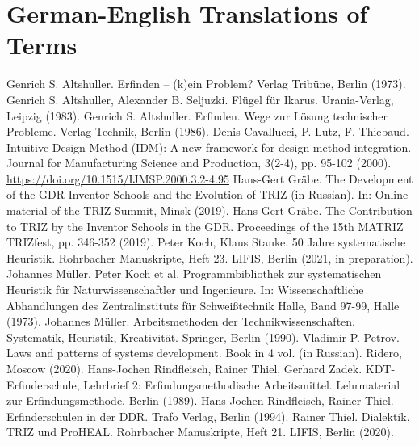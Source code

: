 \documentclass[11pt,a4paper]{article}
\begin{document}
\section{German-English Translations of Terms}



\begin{thebibliography}{xxx}
 Genrich S. Altshuller. Erfinden – (k)ein Problem?
  Verlag Tribüne, Berlin (1973).
  Genrich S. Altshuller, Alexander B. Seljuzki. Flügel
  für Ikarus. Urania-Verlag, Leipzig (1983).
 Genrich S. Altshuller. Erfinden. Wege zur Lösung
  technischer Probleme. Verlag Technik, Berlin (1986). 
 Denis Cavallucci, P. Lutz, F. Thiebaud. Intuitive
  Design Method (IDM): A new framework for design method integration. Journal
  for Manufacturing Science and Production, 3(2-4), pp. 95-102 (2000).
  \url{https://doi.org/10.1515/IJMSP.2000.3.2-4.95}
 Hans-Gert Gräbe. The Development of the GDR Inventor
  Schools and the Evolution of TRIZ (in Russian). In: Online material of the
  TRIZ Summit, Minsk (2019).
 Hans-Gert Gräbe. The Contribution to TRIZ by the
  Inventor Schools in the GDR. Proceedings of the 15th MATRIZ TRIZfest, pp.
  346-352 (2019).
 Peter Koch, Klaus Stanke. 50 Jahre systematische Heuristik.
  Rohrbacher Manuskripte, Heft 23. LIFIS, Berlin (2021, in preparation).
 Johannes Müller, Peter Koch et al. Programmbibliothek
  zur systematischen Heuristik für Naturwissenschaftler und Ingenieure. In:
  Wissenschaftliche Abhandlungen des Zentralinstituts für Schweißtechnik
  Halle, Band 97-99, Halle (1973).
 Johannes Müller. Arbeitsmethoden der
  Technikwissenschaften.  Systematik, Heuristik, Kreativität. Springer, Berlin
  (1990).
 Vladimir P. Petrov. Laws and patterns of systems
  development. Book in 4 vol. (in Russian).  Ridero, Moscow (2020).
 Hans-Jochen Rindfleisch, Rainer Thiel, Gerhard Zadek.
  KDT-Erfinderschule, Lehrbrief 2: Erfindungs­methodische Arbeitsmittel.
  Lehrmaterial zur Erfindungsmethode. Berlin (1989).
 Hans-Jochen Rindfleisch, Rainer Thiel. Erfinderschulen in der
  DDR. Trafo Verlag, Berlin (1994).
  Rainer Thiel.  Dialektik, TRIZ und ProHEAL. Rohrbacher
   Manuskripte, Heft 21. LIFIS, Berlin (2020).
\end{thebibliography}
\end{document}
